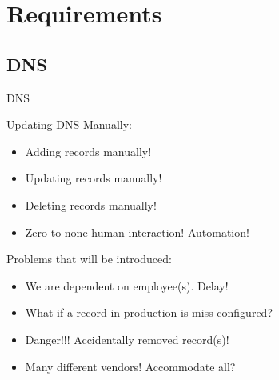 \section{Requirements}\label{sec:requirements}
\subsection{DNS}\label{subsec:minimal-requirements-dns}
\begin{frame}{DNS}
	\begin{alertblock}{Updating DNS Manually:}
		\begin{itemize}
			\item<1-| alert@1> Adding records \alert{manually}!
			\item<2-| alert@2> Updating records \alert{manually}!
			\item<3-| alert@3> Deleting records \alert{manually}!
			\item<4-| alert@4> Zero to none human interaction! \alert{Automation}!
		\end{itemize}	
	\end{alertblock}
	\begin{exampleblock}{Problems that will be introduced:}
		\begin{itemize}
			\item<1-| alert@1> We are dependent on employee(s). \alert{Delay}!
			\item<2-| alert@2> What if a record in production is \alert{miss configured}?
			\item<3-| alert@3> \alert{Danger!!!} Accidentally removed record(s)!
			\item<4-| alert@4> \alert{Many different vendors}! Accommodate all?
		\end{itemize}	
	\end{exampleblock}
\end{frame}

